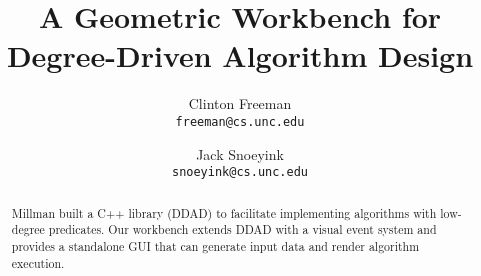 \documentclass{article}
\title{A Geometric Workbench for Degree-Driven Algorithm Design}
\author{
        Clinton Freeman \\
        \texttt{freeman@cs.unc.edu}
        \and
        Jack Snoeyink \\
    \texttt{snoeyink@cs.unc.edu}
}
\theoremstyle{definition}
\begin{document}
\maketitle


\begin{abstract}
Millman built a C++ library (DDAD) to facilitate implementing algorithms with
low-degree predicates. Our workbench extends DDAD with a visual event system and
provides a standalone GUI that can generate input data and render algorithm
execution.
\end{abstract}














 



\appendix

\end{document}
